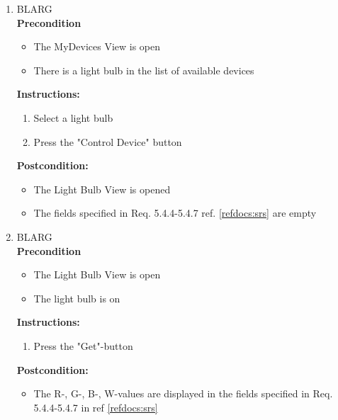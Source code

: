 \documentclass[a4paper]{article}
\newlength{\testlabellength}
\newenvironment{testlist}{\begin{enumerate}[label=\bfseries Instruction \thesubsection.\arabic* , labelindent=0pt, labelwidth=\testlabellength , leftmargin=2cm]}{\end{enumerate}}
\newenvironment{precondition}{
{\color{white}BLARG}\\ 
\textbf{Precondition}
\begin{itemize}[labelindent=0cm, labelwidth=2cm , leftmargin=1cm]
}
{\end{itemize}}
\newenvironment{instruction}{
\textbf{Instructions:}
\begin{enumerate}[label=\bfseries  \arabic*., labelindent=0cm, labelwidth=2cm , leftmargin=1cm]
}
{\end{enumerate}}
\newenvironment{postcondition}{
\textbf{Postcondition:}
\begin{itemize}[labelindent=0cm, labelwidth=2cm , leftmargin=1cm]
}
{\end{itemize}}
\begin{document}
\begin{appendices}
\begin{testlist}
	\item
		\begin{precondition}
			\item The MyDevices View is open
			\item There is a light bulb in the list of available devices
		\end{precondition}
		\begin{instruction}
			\item Select a light bulb
			\item Press the "Control Device" button
		\end{instruction}
		\begin{postcondition}
			\item The Light Bulb View is opened
			\item The fields specified in Req. 5.4.4-5.4.7 ref. \ref{refdocs:srs} are empty
		\end{postcondition}	   

	\item
		\begin{precondition}
			\item The Light Bulb View is open
			\item The light bulb is on
		\end{precondition}
		\begin{instruction}
			\item Press the "Get"-button
		\end{instruction}
		\begin{postcondition}
			\item The R-, G-, B-, W-values are displayed in the fields specified in Req. 5.4.4-5.4.7 in ref \ref{refdocs:srs}
		\end{postcondition}


\end{testlist}
\end{appendices}
\end{document}
